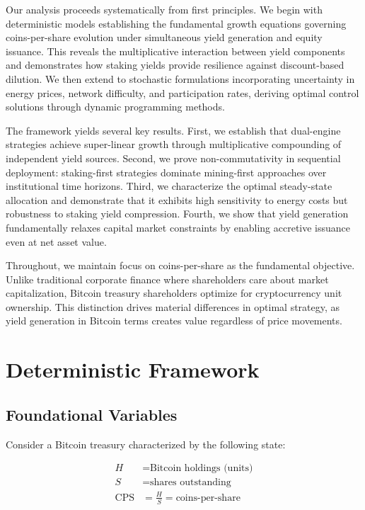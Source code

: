 \documentclass[
  journal=medium,
  manuscript=article-type,
  year=2025,
  volume=1,
]{cup-journal}
\theoremstyle{definition}
\begin{document}
Our analysis proceeds systematically from first principles. We begin with deterministic models establishing the fundamental growth equations governing coins-per-share evolution under simultaneous yield generation and equity issuance. This reveals the multiplicative interaction between yield components and demonstrates how staking yields provide resilience against discount-based dilution. We then extend to stochastic formulations incorporating uncertainty in energy prices, network difficulty, and participation rates, deriving optimal control solutions through dynamic programming methods.

The framework yields several key results. First, we establish that dual-engine strategies achieve super-linear growth through multiplicative compounding of independent yield sources. Second, we prove non-commutativity in sequential deployment: staking-first strategies dominate mining-first approaches over institutional time horizons. Third, we characterize the optimal steady-state allocation and demonstrate that it exhibits high sensitivity to energy costs but robustness to staking yield compression. Fourth, we show that yield generation fundamentally relaxes capital market constraints by enabling accretive issuance even at net asset value.

Throughout, we maintain focus on coins-per-share as the fundamental objective. Unlike traditional corporate finance where shareholders care about market capitalization, Bitcoin treasury shareholders optimize for cryptocurrency unit ownership. This distinction drives material differences in optimal strategy, as yield generation in Bitcoin terms creates value regardless of price movements.

\section{Deterministic Framework}

\subsection{Foundational Variables}

Consider a Bitcoin treasury characterized by the following state:

\begin{align}
H &= \text{Bitcoin holdings (units)} \\
S &= \text{shares outstanding} \\
\text{CPS} &= \frac{H}{S} = \text{coins-per-share}
\end{align}
\end{document}
